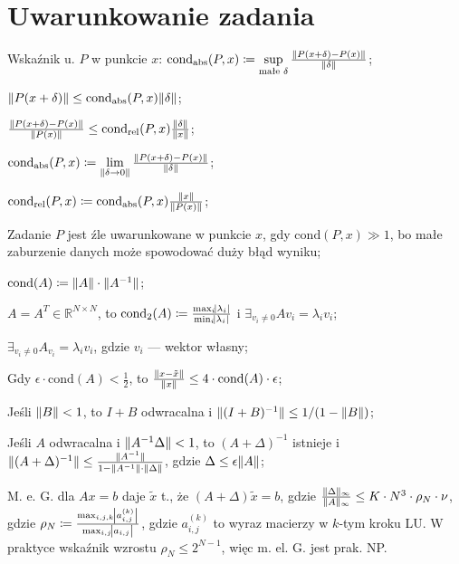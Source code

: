 \section{Uwarunkowanie zadania}

\entry
Wskaźnik u. $P$ w punkcie $x$:
$\mathrm{cond}_{\mathrm{abs}}(P,x) \coloneqq \sup\limits_{\text{małe }\delta} \frac{\|P(x+\delta) - P(x)\|}{\|\delta\|}$;

\entry
$\|P(x+\delta)\| \leq \mathrm{cond}_{\mathrm{abs}}(P,x)\|\delta\|$;

\entry
$\frac{\|P(x+\delta) - P(x)\|}{\|P(x)\|} \leq \mathrm{cond}_{\mathrm{rel}}(P,x)\frac{\|\delta\|}{\|x\|}$;


\entry
$\mathrm{cond}_{\mathrm{abs}}(P,x) \coloneqq \lim\limits_{\|\delta \to 0\|} \frac{\|P(x+\delta) - P(x)\|}{\|\delta\|}$;

\entry
$\mathrm{cond}_{\mathrm{rel}}(P,x) \coloneqq \mathrm{cond}_{\mathrm{abs}}(P,x)\frac{\|x\|}{\|P(x)\|} $;

\entry
Zadanie $P$ jest źle uwarunkowane w punkcie $x$,
gdy $\mathrm{cond}(P,x) \gg 1$,
bo małe zaburzenie danych może spowodować duży błąd wyniku;

\entry
$\mathrm{cond}(A) \coloneqq \norm{\vphantom{A^{-1}}A}\cdot\norm{A^{-1}}$;

\entry
$A=A^T\in\mathbb{R}^{N\times N}$,
to
$\mathrm{cond}_2(A)\coloneqq \frac{\max_i\abs{\lambda_i}}{\min_i\abs{\lambda_i}}$
i
$\exists_{v_i\neq 0} Av_i=\lambda_i v_i$;

\entry
$\exists_{v_i\neq 0} A_{v_i} = \lambda_i v_i$,
gdzie $v_i$ --- wektor własny;

\entry
Gdy
$\epsilon\cdot\mathrm{cond}(A) < \frac{1}{2}$,
to $\frac{\|x - \tilde{x}\|}{\|x\|} \leq 4 \cdot \mathrm{cond}(A) \cdot \epsilon$;

\entry
Jeśli $\|B\| < 1$,
to $I+B$ odwracalna i $\|(I+B)^{-1}\| \leq 1 / (1 - \|B\|)$;

\entry
Jeśli $A$ odwracalna i $\|A^{-1}\Delta\| < 1$,
to $(A+\Delta)^{-1}$ istnieje
i $\|(A+\Delta)^{-1}\| \leq \frac{\|A^{-1}\|}{1 - \|A^{-1}\| \cdot \|\vphantom{A^1}\Delta\|}$,
gdzie $\Delta \leq \epsilon\|A\|$;

\entry
M. e. G. dla $Ax=b$ daje $\tilde{x}$ t., że
$(A+\Delta) \tilde{x} = b$,
gdzie $\frac{\|\Delta\|_\infty}{\|A\|_\infty} \leq K\cdot N^3 \cdot \rho_N \cdot \nu$,
gdzie $\rho_N \coloneqq \frac{\max_{i,j,k}\abs{a_{i,j}^{(k)}}}{\max_{i,j} \abs{a_{i,j}}}$,
gdzie $a^{(k)}_{i,j}$ to wyraz macierzy w $k$-tym kroku LU. W praktyce wskaźnik wzrostu $\rho_N\leq 2^{N-1}$, więc m. el. G. jest prak. NP.

